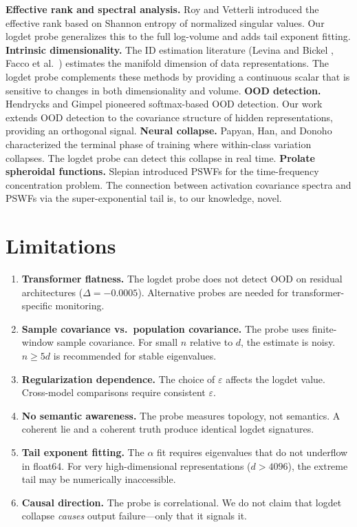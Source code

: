 \documentclass[12pt,a4paper]{article}
\begin{document}
\textbf{Effective rank and spectral analysis.} Roy and Vetterli \cite{roy2007} introduced the effective rank based on Shannon entropy of normalized singular values. Our logdet probe generalizes this to the full log-volume and adds tail exponent fitting. \textbf{Intrinsic dimensionality.} The ID estimation literature (Levina and Bickel \cite{levina2004}, Facco et al.\ \cite{facco2017}) estimates the manifold dimension of data representations. The logdet probe complements these methods by providing a continuous scalar that is sensitive to changes in both dimensionality and volume. \textbf{OOD detection.} Hendrycks and Gimpel \cite{hendrycks2016} pioneered softmax-based OOD detection. Our work extends OOD detection to the covariance structure of hidden representations, providing an orthogonal signal. \textbf{Neural collapse.} Papyan, Han, and Donoho \cite{papyan2020} characterized the terminal phase of training where within-class variation collapses. The logdet probe can detect this collapse in real time. \textbf{Prolate spheroidal functions.} Slepian \cite{slepian} introduced PSWFs for the time-frequency concentration problem. The connection between activation covariance spectra and PSWFs via the super-exponential tail is, to our knowledge, novel.

\section{Limitations}

\begin{enumerate}
    \item \textbf{Transformer flatness.} The logdet probe does not detect OOD on residual architectures ($\Delta = -0.0005$). Alternative probes are needed for transformer-specific monitoring.
    \item \textbf{Sample covariance vs.\ population covariance.} The probe uses finite-window sample covariance. For small $n$ relative to $d$, the estimate is noisy. $n \geq 5d$ is recommended for stable eigenvalues.
    \item \textbf{Regularization dependence.} The choice of $\varepsilon$ affects the logdet value. Cross-model comparisons require consistent $\varepsilon$.
    \item \textbf{No semantic awareness.} The probe measures topology, not semantics. A coherent lie and a coherent truth produce identical logdet signatures.
    \item \textbf{Tail exponent fitting.} The $\alpha$ fit requires eigenvalues that do not underflow in float64. For very high-dimensional representations ($d > 4096$), the extreme tail may be numerically inaccessible.
    \item \textbf{Causal direction.} The probe is correlational. We do not claim that logdet collapse \textit{causes} output failure---only that it signals it.
\end{enumerate}
\end{document}
